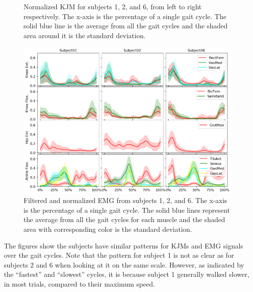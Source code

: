 \documentclass[../main.tex]{subfiles}
\begin{document}
\begin{figure}[ht!]
\begin{subfigure}[b]{0.328\textwidth}
     \end{subfigure}
    \caption{Normalized \ac{KJM} for subjects 1, 2, and 6, from left to right respectively. The x-axis is the percentage of a single gait cycle. The solid blue line is the average from all the gait cycles and the shaded area around it is the standard deviation.}
    \label{fig:kjm-average}
\end{figure}
\begin{figure}[ht!]
    \centering
    \includegraphics[width=\textwidth]{img/results/emg_avg/all_subject_grid_emg_avg.png}
    \caption{Filtered and normalized \ac{EMG} from subjects 1, 2, and 6. The x-axis is the percentage of a single gait cycle. The solid blue lines represent the average from all the gait cycles for each muscle and the shaded area with corresponding color is the standard deviation.}
    \label{fig:emg-average}
\end{figure}
The figures show the subjects have similar patterns for \acp{KJM} and \ac{EMG} signals over the gait cycles.
Note that the pattern for subject 1 is not as clear as for subjects 2 and 6 when looking at it on the same scale.
However, as indicated by the ``fastest'' and ``slowest'' cycles, it is because subject 1 generally walked slower, in most trials, compared to their maximum speed.
\end{document}
